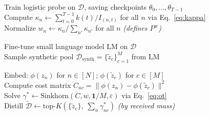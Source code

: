 \begin{center}
  \begin{minipage}{0.99\linewidth}
    \begin{algorithm}[H]

      \caption{Trajectory-Aware Knowledge Estimation (\textbf{TAKE}).}
      \label{alg:take}


      \vspace{-0.5\baselineskip}
      \Comment{\noindent\hrulefill}

      \vspace{0.5\baselineskip}
      Train logistic probe on $\mathcal{D}$, saving checkpoints $\theta_0, \ldots, \theta_{T-1}$ \\
      Compute $\kappa_n \leftarrow \textstyle\sum_{t=0}^{T-1} k(t) / I_{(n,t)}$ for all $n$ \hfill via Eq.~\ref{eq:kappa} \\
      Normalize $w_n \leftarrow \kappa_n / \sum_{n'} \kappa_{n'}$ for all $n$ \hfill\textit{(defines $P^w$)}

      \vspace{0.5\baselineskip}
      Fine-tune small language model $\text{LM}$ on $\mathcal{D}$ \\
      Sample synthetic pool $\mathcal{D}_\text{synth} = \{\tilde{z}_c\}_{c=1}^{M}$ from $\text{LM}$

      \vspace{0.5\baselineskip}
      Embed: $\phi(z_n)$ for $n \in [N]$; $\phi(\tilde{z}_c)$ for $c \in [M]$ \\
      Compute cost matrix $C_{nc} = \|\phi(z_n) - \phi(\tilde{z}_c)\|^2$ \\
      Solve $\gamma^* \leftarrow \text{Sinkhorn}(C, w, \mathbf{1}/M, \varepsilon)$ \hfill via Eq.~\ref{eq:ot} \\
      Distill $\tilde{\mathcal{D}} \leftarrow \text{top}\text{-}K\!\left(\{\tilde{z}_c\},\; \textstyle\sum_n \gamma^*_{nc}\right)$ \hfill\textit{(by received mass)}

      \vspace{0.5\baselineskip}
    \end{algorithm}
  \end{minipage}
\end{center}
